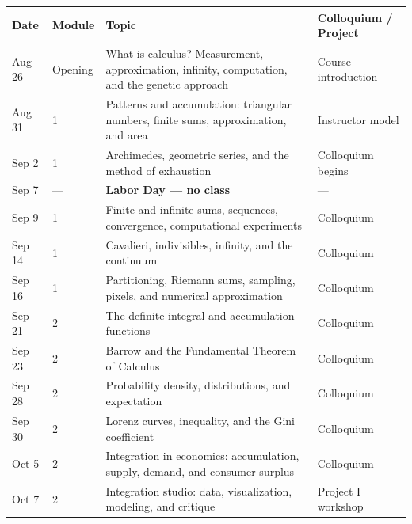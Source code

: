 \documentclass[11pt]{article}
\begin{document}
\begin{tabularx}{\textwidth}
{@{}p{}p{}X p{}@{}}
\toprule

\textbf{Date} &
\textbf{Module} &
\textbf{Topic} &
\textbf{Colloquium / Project}
\\
\midrule

Aug 26 &
Opening &
What is calculus? Measurement, approximation, infinity, computation,
and the genetic approach &
Course introduction
\\

Aug 31 &
1 &
Patterns and accumulation: triangular numbers, finite sums,
approximation, and area &
Instructor model
\\

Sep 2 &
1 &
Archimedes, geometric series, and the method of exhaustion &
Colloquium begins
\\

Sep 7 &
--- &
\textbf{Labor Day --- no class} &
---
\\

Sep 9 &
1 &
Finite and infinite sums, sequences, convergence, computational
experiments &
Colloquium
\\

Sep 14 &
1 &
Cavalieri, indivisibles, infinity, and the continuum &
Colloquium
\\

Sep 16 &
1 &
Partitioning, Riemann sums, sampling, pixels, and numerical
approximation &
Colloquium
\\

Sep 21 &
2 &
The definite integral and accumulation functions &
Colloquium
\\

Sep 23 &
2 &
Barrow and the Fundamental Theorem of Calculus &
Colloquium
\\

Sep 28 &
2 &
Probability density, distributions, and expectation &
Colloquium
\\

Sep 30 &
2 &
Lorenz curves, inequality, and the Gini coefficient &
Colloquium
\\

Oct 5 &
2 &
Integration in economics: accumulation, supply, demand,
and consumer surplus &
Colloquium
\\

Oct 7 &
2 &
Integration studio: data, visualization, modeling, and critique &
Project I workshop
\\


\end{tabularx}
\end{document}
